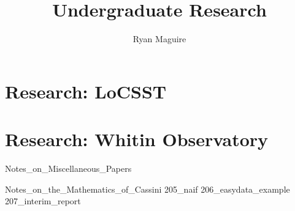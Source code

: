 \documentclass[crop=false,class=book,oneside]{standalone}
\begin{document}
    \newif\ifresearch
    \ifstandalone
        \title{Undergraduate Research}
        \author{Ryan Maguire}
        \date{\vspace{-5ex}}
        \maketitle
        \tableofcontents
        \listoffigures
        \listoftables
        \clearpage
    \fi
    \part{Research: LoCSST}
    \part{Research: Whitin Observatory}
        
                  {Notes_on_Miscellaneous_Papers}
        
                  {Notes_on_the_Mathematics_of_Cassini}
    {205_naif}
    {206_easydata_example}
    {207_interim_report}
\end{document}
